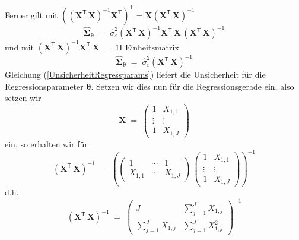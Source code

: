 Ferner gilt mit $\left( \left( \mathbf{X}^\mathsf{T}  \, \mathbf{X} \right)^{-1} \mathbf{X}^\mathsf{T} \right)^\mathsf{T} = \mathbf{X} \left( \mathbf{X}^\mathsf{T}  \, \mathbf{X} \right)^{-1}$
\begin{equation}
\boldsymbol{\hat \Sigma}_{\boldsymbol{\theta}} \; = \; \hat \sigma_{\varepsilon}^2
\left( \mathbf{X}^\mathsf{T}  \, \mathbf{X} \right)^{-1} \mathbf{X}^\mathsf{T}  \,  \mathbf{X} \, \left( \mathbf{X}^\mathsf{T}  \, \mathbf{X} \right)^{-1} 
\end{equation}
und mit $\left( \mathbf{X}^\mathsf{T}  \, \mathbf{X} \right)^{-1} \mathbf{X}^\mathsf{T}  \, \mathbf{X}  \; = \; 1 \! \mathrm{I}$ Einheitsmatrix
\begin{equation}
\boldsymbol{\hat \Sigma}_{\boldsymbol{\theta}} \; = \; \hat \sigma_{\varepsilon}^2
\left( \mathbf{X}^\mathsf{T}  \, \mathbf{X} \right)^{-1}
\label{UnsicherheitRegressparams}
\end{equation}
Gleichung (\ref{UnsicherheitRegressparams}) liefert die Unsicherheit für die Regressionsparameter
$\boldsymbol{\theta}$. 
Setzen wir dies nun für die Regressionsgerade ein, also setzen wir
$$
\mathbf{X} \; = \;
\left(
\begin{array}{cc}
1 &  X_{1,1} \\
\vdots & \vdots\\
1 & X_{1,J} 
\end{array}
\right)
$$
ein, so erhalten wir für
\begin{equation}
\left( \mathbf{X}^\mathsf{T}  \, \mathbf{X} \right)^{-1} \; = \;
\left( \left(
\begin{array}{ccc}
1 & \cdots & 1 \\
X_{1,1} & \cdots & X_{1,J} 
\end{array}
\right)
\, 
\left(
\begin{array}{cc}
1 &  X_{1,1} \\
\vdots & \vdots\\
1 & X_{1,J} 
\end{array}
\right) \right)^{-1}
\end{equation}
d.h.
\begin{equation}
\left( \mathbf{X}^\mathsf{T}  \, \mathbf{X} \right)^{-1} \; = \;
\left(
\begin{array}{ccc}
J & \sum\limits_{j=1}^J X_{1,j} \\
\sum\limits_{j=1}^J X_{1,j} & \sum\limits_{j=1}^J X_{1,j}^2
\end{array}
\right)^{-1}
\end{equation}
